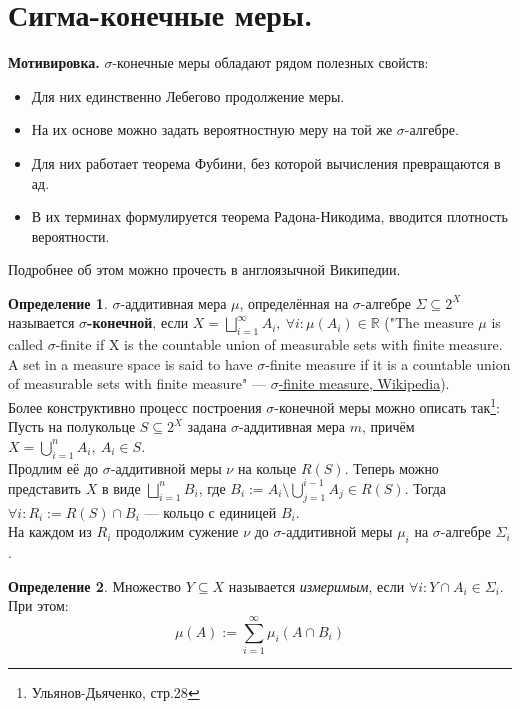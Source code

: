 \documentclass[11pt,a4paper]{report}
\def\Real{\mathbb{R}}
\theoremstyle{definition}
\theoremstyle{definition}
\theoremstyle{definition}
\newtheorem{definition}{Определение}[section]
\begin{document}
	\section{Сигма-конечные меры.}
	\textbf{Мотивировка.} $ \sigma $-конечные меры обладают рядом полезных свойств:
	\begin{itemize}
		\item Для них единственно Лебегово продолжение меры.
		\item На их основе можно задать вероятностную меру на той же $ \sigma $-алгебре.
		\item Для них работает теорема Фубини, без которой вычисления превращаются в ад.
		\item В их терминах формулируется теорема Радона-Никодима, вводится плотность вероятности.
	\end{itemize}
	Подробнее об этом можно прочесть в англоязычной Википедии.
	\begin{definition}
		$ \sigma $-аддитивная мера $ \mu $, определённая на $ \sigma $-алгебре $ \Sigma \subseteq 2^{X} $ называется \textbf{$ \sigma $-конечной}, если $ X = \bigsqcup_{i=1}^{\infty}{A_{i}},\ \forall i: \mu(A_{i}) \in \Real $ ("The measure $ \mu $ is called $ \sigma $-finite if X is the countable union of measurable sets with finite measure. A set in a measure space is said to have $ \sigma $-finite measure if it is a countable union of measurable sets with finite measure" — \href{https://en.wikipedia.org/wiki/%CE%A3-finite_measure}{$ \sigma $-finite measure, Wikipedia}).\\
		Более конструктивно процесс построения $ \sigma $-конечной меры можно описать так\footnote{Ульянов-Дьяченко, стр.28}:\\
		Пусть на полукольце $ S \subseteq 2^{X} $ задана $ \sigma $-аддитивная мера $ m $, причём $ X = \bigcup\limits_{i=1}^{n}{A_{i}},\ A_{i} \in S $.\\
		Продлим её до $ \sigma $-аддитивной меры $ \nu $ на кольце $ R(S) $. Теперь можно представить $ X $ в виде $ \bigsqcup_{i=1}^{n}{B_{i}} $, где $ B_{i} := A_{i} \setminus \bigcup_{j=1}^{i-1}{A_{j}} \in R(S) $. Тогда $ \forall i: R_{i} := R(S) \cap B_{i} $ — кольцо с единицей $ B_{i} $.\\
		На каждом из $ R_{i} $ продолжим сужение $ \nu $ до $ \sigma $-аддитивной меры $ \mu_{i} $ на $ \sigma $-алгебре $ \Sigma_{i} $.
	\end{definition}
	\begin{definition}
		Множество $ Y \subseteq X $ называется \textit{измеримым}, если $ \forall i: Y \cap A_{i} \in \Sigma_{i} $.\\
		При этом: \[ \mu(A) := \sum_{i=1}^{\infty}{\mu_{i}(A \cap B_{i})} \]
	\end{definition}
\end{document}

